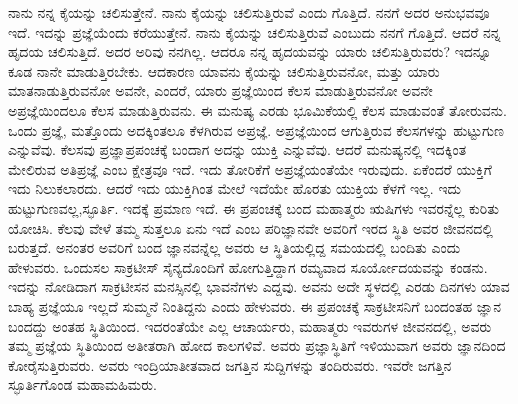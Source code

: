 ನಾನು ನನ್ನ ಕೈಯನ್ನು ಚಲಿಸುತ್ತೇನೆ. ನಾನು ಕೈಯನ್ನು ಚಲಿಸುತ್ತಿರುವೆ ಎಂದು ಗೊತ್ತಿದೆ. ನನಗೆ ಅದರ ಅನುಭವವೂ ಇದೆ. ಇದನ್ನು ಪ್ರಜ್ಞೆಯೆಂದು ಕರೆಯುತ್ತೇನೆ. ನಾನು ಕೈಯನ್ನು ಚಲಿಸುತ್ತಿರುವೆ ಎಂಬುದು ನನಗೆ ಗೊತ್ತಿದೆ. ಆದರೆ ನನ್ನ ಹೃದಯ ಚಲಿಸುತ್ತಿದೆ. ಅದರ ಅರಿವು ನನಗಿಲ್ಲ. ಆದರೂ ನನ್ನ ಹೃದಯವನ್ನು ಯಾರು ಚಲಿಸುತ್ತಿರುವರು? ಇದನ್ನೂ ಕೂಡ ನಾನೇ ಮಾಡುತ್ತಿರಬೇಕು. ಆದಕಾರಣ ಯಾವನು ಕೈಯನ್ನು ಚಲಿಸುತ್ತಿರುವನೋ, ಮತ್ತು ಯಾರು ಮಾತನಾಡುತ್ತಿರುವನೋ ಅವನೇ, ಎಂದರೆ, ಯಾರು ಪ್ರಜ್ಞೆಯಿಂದ ಕೆಲಸ ಮಾಡುತ್ತಿರುವನೋ ಅವನೇ ಅಪ್ರಜ್ಞೆಯಿಂದಲೂ ಕೆಲಸ ಮಾಡುತ್ತಿರುವನು. ಈ ಮನುಷ್ಯ ಎರಡು ಭೂಮಿಕೆಯಲ್ಲಿ ಕೆಲಸ ಮಾಡುವಂತೆ ತೋರುವನು. ಒಂದು ಪ್ರಜ್ಞೆ, ಮತ್ತೊಂದು ಅದಕ್ಕಿಂತಲೂ ಕೆಳಗಿರುವ ಅಪ್ರಜ್ಞೆ. ಅಪ್ರಜ್ಞೆಯಿಂದ ಆಗುತ್ತಿರುವ ಕೆಲಸಗಳನ್ನು ಹುಟ್ಟುಗುಣ ಎನ್ನುವೆವು. ಕೆಲಸವು ಪ್ರಜ್ಞಾಪ್ರಪಂಚಕ್ಕೆ ಬಂದಾಗ ಅದನ್ನು ಯುಕ್ತಿ ಎನ್ನುವೆವು. ಆದರೆ ಮನುಷ್ಯನಲ್ಲಿ ಇದಕ್ಕಿಂತ ಮೇಲಿರುವ ಅತಿಪ್ರಜ್ಞೆ ಎಂಬ ಕ್ಷೇತ್ರವೂ ಇದೆ. ಇದು ತೋರಿಕೆಗೆ ಅಪ್ರಜ್ಞೆಯಂತೆಯೇ ಇರುವುದು. ಏಕೆಂದರೆ ಯುಕ್ತಿಗೆ ಇದು ನಿಲುಕಲಾರದು. ಆದರೆ ಇದು ಯುಕ್ತಿಗಿಂತ ಮೇಲೆ ಇದೆಯೇ ಹೊರತು ಯುಕ್ತಿಯ ಕೆಳಗೆ ಇಲ್ಲ. ಇದು ಹುಟ್ಟುಗುಣವಲ್ಲ,\break ಸ್ಫೂರ್ತಿ. ಇದಕ್ಕೆ ಪ್ರಮಾಣ ಇದೆ. ಈ ಪ್ರಪಂಚಕ್ಕೆ ಬಂದ ಮಹಾತ್ಮರು ಋಷಿಗಳು ಇವರನ್ನೆಲ್ಲ ಕುರಿತು ಯೋಚಿಸಿ. ಕೆಲವು ವೇಳೆ ತಮ್ಮ ಸುತ್ತಲೂ ಏನು ಇದೆ ಎಂಬ ಪರಿಜ್ಞಾನವೇ ಅವರಿಗೆ ಇರದ ಸ್ಥಿತಿ ಅವರ ಜೀವನದಲ್ಲಿ ಬರುತ್ತದೆ. ಅನಂತರ ಅವರಿಗೆ ಬಂದ ಜ್ಞಾನವನ್ನೆಲ್ಲ ಅವರು ಆ ಸ್ಥಿತಿಯಲ್ಲಿದ್ದ ಸಮಯದಲ್ಲಿ ಬಂದಿತು ಎಂದು ಹೇಳುವರು. ಒಂದುಸಲ ಸಾಕ್ರಟೀಸ್ ಸೈನ್ಯದೊಂದಿಗೆ ಹೋಗುತ್ತಿದ್ದಾಗ ರಮ್ಯವಾದ ಸೂರ್ಯೋದಯವನ್ನು ಕಂಡನು. ಇದನ್ನು ನೋಡಿದಾಗ ಸಾಕ್ರಟೀಸನ ಮನಸ್ಸಿನಲ್ಲಿ ಭಾವನೆಗಳು ಎದ್ದವು. ಅವನು ಅದೇ ಸ್ಥಳದಲ್ಲಿ ಎರಡು ದಿನಗಳು ಯಾವ ಬಾಹ್ಯ ಪ್ರಜ್ಞೆಯೂ ಇಲ್ಲದೆ ಸುಮ್ಮನೆ ನಿಂತಿದ್ದನು ಎಂದು ಹೇಳುವರು. ಈ ಪ್ರಪಂಚಕ್ಕೆ ಸಾಕ್ರಟೀಸನಿಗೆ ಬಂದಂತಹ ಜ್ಞಾನ ಬಂದದ್ದು ಅಂತಹ ಸ್ಥಿತಿಯಿಂದ. ಇದರಂತೆಯೇ ಎಲ್ಲ ಆಚಾರ್ಯರು, ಮಹಾತ್ಮರು ಇವರುಗಳ ಜೀವನದಲ್ಲಿ, ಅವರು ತಮ್ಮ ಪ್ರಜ್ಞೆಯ ಸ್ಥಿತಿಯಿಂದ ಅತೀತರಾಗಿ ಹೋದ ಕಾಲಗಳಿವೆ. ಅವರು ಪ್ರಜ್ಞಾಸ್ಥಿತಿಗೆ ಇಳಿಯುವಾಗ ಅವರು ಜ್ಞಾನದಿಂದ ಕೋರೈಸುತ್ತಿರುವರು. ಅವರು ಇಂದ್ರಿಯಾತೀತವಾದ ಜಗತ್ತಿನ ಸುದ್ದಿಗಳನ್ನು ತಂದಿರುವರು. ಇವರೇ ಜಗತ್ತಿನ ಸ್ಫೂರ್ತಿಗೊಂಡ ಮಹಾಮಹಿಮರು.

